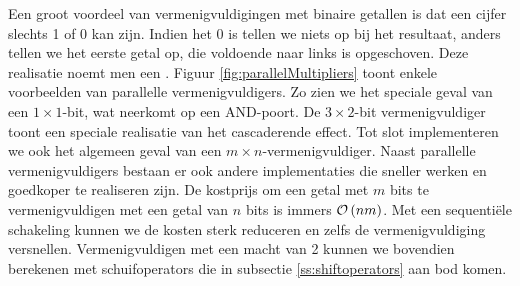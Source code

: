 Een groot voordeel van vermenigvuldigingen met binaire getallen is dat een cijfer slechts 1 of 0 kan zijn. Indien het 0 is tellen we niets op bij het resultaat, anders tellen we het eerste getal op, die voldoende naar links is opgeschoven. Deze realisatie noemt men een . Figuur \ref{fig:parallelMultipliers} toont enkele voorbeelden van parallelle vermenigvuldigers. Zo zien we het speciale geval van een $1\times 1$-bit, wat neerkomt op een AND-poort. De $3\times 2$-bit vermenigvuldiger toont een speciale realisatie van het cascaderende effect. Tot slot implementeren we ook het algemeen geval van een $m\times n$-vermenigvuldiger. Naast parallelle vermenigvuldigers bestaan er ook andere implementaties die sneller werken en goedkoper te realiseren zijn. De kostprijs om een getal met $m$ bits te vermenigvuldigen met een getal van $n$ bits is immers $\mathcal{O}\left( nm \right)$. Met een sequenti\"ele schakeling kunnen we de kosten sterk reduceren en zelfs de vermenigvuldiging versnellen. Vermenigvuldigen met een macht van 2 kunnen we bovendien berekenen met schuifoperators die in subsectie \ref{ss:shiftoperators} aan bod komen.
